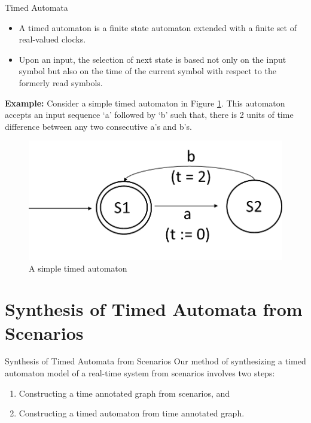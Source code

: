 \documentclass[10pt]{beamer}
\theoremstyle{plain}
\theoremstyle{definition}
\begin{document}
\begin{frame}{Timed Automata}
	\begin{itemize}
		\item A timed automaton \cite{Alur:1994:TTA:180782.180519} is a finite state automaton extended with a finite set of real-valued clocks. 
		\item Upon an input, the selection of next state is based not only on the input symbol but also on the time of the current symbol with respect to the formerly read symbols. 
	\end{itemize}
	\textbf{Example:} Consider a simple timed automaton in Figure \ref{fig:fig1}. This automaton accepts an input sequence `a' followed by `b' such that, there is 2 units of time difference between any two consecutive a's and b's.
	 
	 \begin{figure}
	 	\centering
	 	\includegraphics[width=0.5\linewidth]{"fig1"}
	 	\caption{A simple timed automaton}
	 	\label{fig:fig1}
	 \end{figure}
\end{frame}

\section{Synthesis of Timed Automata from Scenarios}

\begin{frame}{Synthesis of Timed Automata from Scenarios}
Our method of synthesizing a timed automaton model of a real-time system from scenarios involves two steps:
	\begin{enumerate}
		\item Constructing a time annotated graph from scenarios, and
		\item Constructing a timed automaton from time annotated graph.
	\end{enumerate}
\end{frame}
\end{document}
